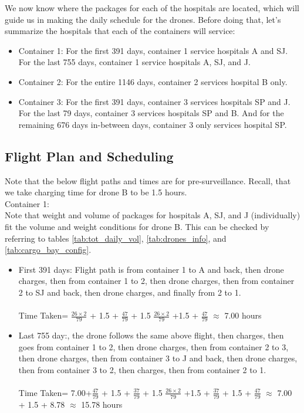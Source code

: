 We now know where the packages for each of the hospitals are located, which will guide us in making the daily schedule for the drones. Before doing that, let's summarize the hospitals that each of the containers will service: 

\begin{itemize}
    \item Container 1: For the first 391 days, container 1 service hospitals A and SJ. For the last 755 days, container 1 service hospitals A, SJ, and J. 
    \item Container 2: For the entire 1146 days, container 2 services hospital B only. 
    \item Container 3: For the first 391 days, container 3 services hospitals SP and J. For the last 79 days, container 3 services hospitals SP and B. And for the remaining 676 days in-between days, container 3 only services hospital SP. 
\end{itemize}

\subsection{Flight Plan and Scheduling}

Note that the below flight paths and times are for pre-surveillance. Recall, that we take charging time for drone B to be 1.5 hours. \\

Container 1:\\
Note that weight and volume of packages for hospitals A, SJ, and J (individually) fit the volume and weight conditions for drone B. This can be checked by referring to tables \ref{tab:tot_daily_vol}, \ref{tab:drones_info}, and \ref{tab:cargo_bay_config}. \\
\begin{itemize}
    \item First 391 days: Flight path is from container 1 to A and back, then drone charges, then from container 1 to 2, then drone charges, then from container 2 to SJ and back, then drone charges, and finally from 2 to 1.\\ 
    \\
    Time Taken= $\frac{26 \times 2}{79}$ + 1.5 + $\frac{47}{79}$ + 1.5 $\frac{26 \times 2}{79}$ +1.5 +  $\frac{47}{79}$ $\approx$ 7.00 hours
    \item Last 755 day:, the drone follows the same above flight, then charges, then goes from container 1 to 2, then drone charges, then from container 2 to 3, then drone charges, then from container 3 to J and back, then drone charges, then from container 3 to 2, then charges, then from container 2 to 1. \\
    \\
     Time Taken= 7.00+$\frac{47}{79}$ + 1.5 + $\frac{37}{79}$ + 1.5 $\frac{26 \times 2}{79}$ +1.5 +  $\frac{37}{79}$ + 1.5 + $\frac{47}{79}$  $\approx$ 7.00 + 1.5 + 8.78 $\approx$ 15.78 hours
    
    
\end{itemize}

